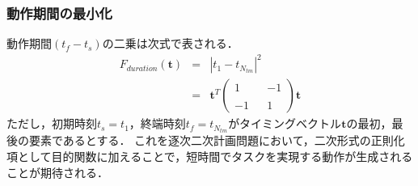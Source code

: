 \subsubsection*{動作期間の最小化}

動作期間$(t_f - t_s)$の二乗は次式で表される．
\begin{eqnarray}
  F_{\mathit{duration}}(\bm{t})
  &=& \left| t_1 - t_{N_{\mathit{tm}}} \right|^2 \\
  &=& \bm{t}^T \begin{pmatrix} 1 & & -1 \\ & & \\ -1 & & 1 \end{pmatrix} \bm{t} \label{eq:bspline-motion-duration}
\end{eqnarray}
ただし，初期時刻$t_s = t_1$，終端時刻$t_f = t_{N_{\mathit{tm}}}$がタイミングベクトル$\bm{t}$の最初，最後の要素であるとする．
これを逐次二次計画問題において，二次形式の正則化項として目的関数に加えることで，短時間でタスクを実現する動作が生成されることが期待される．
\\
\\
